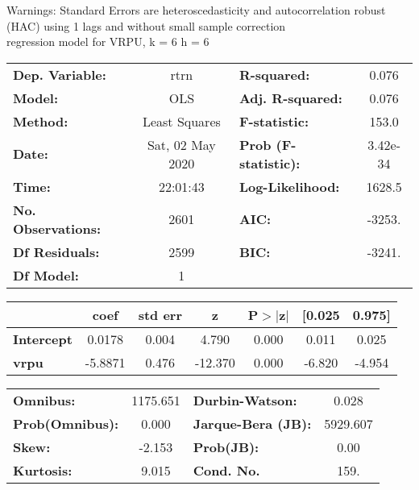 Warnings: \newline
 [1] Standard Errors are heteroscedasticity and autocorrelation robust (HAC) using 1 lags and without small sample correction\\ 

regression model for VRPU, k = 6 h = 6\begin{center}
\begin{tabular}{lclc}
\toprule
\textbf{Dep. Variable:}    &       rtrn       & \textbf{  R-squared:         } &     0.076   \\
\textbf{Model:}            &       OLS        & \textbf{  Adj. R-squared:    } &     0.076   \\
\textbf{Method:}           &  Least Squares   & \textbf{  F-statistic:       } &     153.0   \\
\textbf{Date:}             & Sat, 02 May 2020 & \textbf{  Prob (F-statistic):} &  3.42e-34   \\
\textbf{Time:}             &     22:01:43     & \textbf{  Log-Likelihood:    } &    1628.5   \\
\textbf{No. Observations:} &        2601      & \textbf{  AIC:               } &    -3253.   \\
\textbf{Df Residuals:}     &        2599      & \textbf{  BIC:               } &    -3241.   \\
\textbf{Df Model:}         &           1      & \textbf{                     } &             \\
\bottomrule
\end{tabular}
\begin{tabular}{lcccccc}
                   & \textbf{coef} & \textbf{std err} & \textbf{z} & \textbf{P$> |$z$|$} & \textbf{[0.025} & \textbf{0.975]}  \\
\midrule
\textbf{Intercept} &       0.0178  &        0.004     &     4.790  &         0.000        &        0.011    &        0.025     \\
\textbf{vrpu}      &      -5.8871  &        0.476     &   -12.370  &         0.000        &       -6.820    &       -4.954     \\
\bottomrule
\end{tabular}
\begin{tabular}{lclc}
\textbf{Omnibus:}       & 1175.651 & \textbf{  Durbin-Watson:     } &    0.028  \\
\textbf{Prob(Omnibus):} &   0.000  & \textbf{  Jarque-Bera (JB):  } & 5929.607  \\
\textbf{Skew:}          &  -2.153  & \textbf{  Prob(JB):          } &     0.00  \\
\textbf{Kurtosis:}      &   9.015  & \textbf{  Cond. No.          } &     159.  \\
\bottomrule
\end{tabular}
\end{center}

